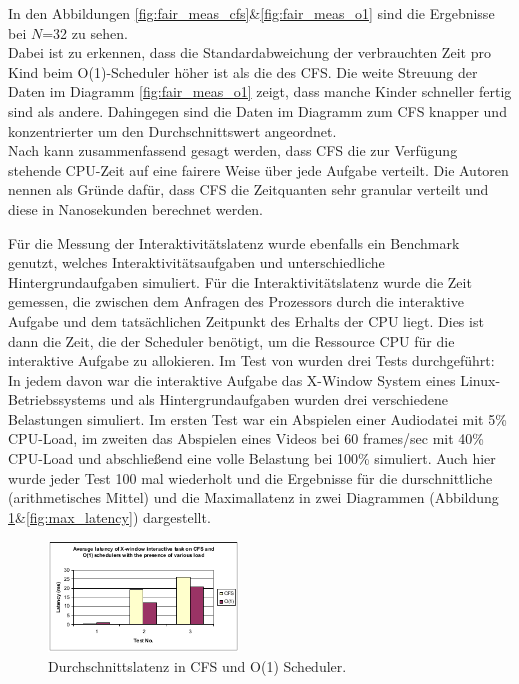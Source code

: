 In den Abbildungen \ref{fig:fair_meas_cfs}\&\ref{fig:fair_meas_o1} sind die Ergebnisse bei $N$=32 zu sehen. \\
Dabei ist zu erkennen, dass die Standardabweichung der verbrauchten Zeit pro Kind beim O(1)-Scheduler höher ist als die des CFS. Die weite Streuung der Daten im Diagramm \ref{fig:fair_meas_o1} zeigt, dass manche Kinder schneller fertig sind als andere. Dahingegen sind die Daten im Diagramm zum CFS knapper und konzentrierter um den Durchschnittswert angeordnet. \\
Nach \cite{papercomparison} kann zusammenfassend gesagt werden, dass CFS die zur Verfügung stehende CPU-Zeit auf eine fairere Weise über jede Aufgabe verteilt. Die Autoren nennen als Grün\-de dafür, dass CFS die Zeitquanten sehr granular verteilt und diese in Nanosekunden berechnet werden.

Für die Messung der Interaktivitätslatenz wurde ebenfalls ein Benchmark genutzt, welches Interaktivitätsaufgaben und unterschiedliche Hintergrundaufgaben simuliert. Für die Interaktivitätslatenz wurde die Zeit gemessen, die zwischen dem Anfragen des Prozessors durch die interaktive Aufgabe und dem tatsächlichen Zeitpunkt des Erhalts der CPU liegt. Dies ist dann die Zeit, die der Scheduler benötigt, um die Ressource CPU für die interaktive Aufgabe zu allokieren. Im Test von \cite{papercomparison} wurden drei Tests durchgeführt: In jedem davon war die interaktive Aufgabe das X-Window System eines Linux-Betriebssystems und als Hintergrundaufgaben wurden drei verschiedene Belastungen simuliert. Im ersten Test war ein Abspielen einer Audiodatei mit 5\% CPU-Load, im zweiten das Abspielen eines Videos bei 60 frames/sec mit 40\% CPU-Load und abschließend eine volle Belastung bei 100\% simuliert. Auch hier wurde jeder Test 100 mal wiederholt und die Ergebnisse für die durschnittliche (arithmetisches Mittel) und die Maximallatenz in zwei Diagrammen (Abbildung \ref{fig:avg_latency}\&\ref{fig:max_latency}) dargestellt. 
\begin{figure} [h]
 	\centering
 	\includegraphics[width=0.45\textwidth]{pictures/avg_latency.png}
 	\caption{Durchschnittslatenz in CFS und O(1) Scheduler.}
 	\label{fig:avg_latency}
\end{figure}

